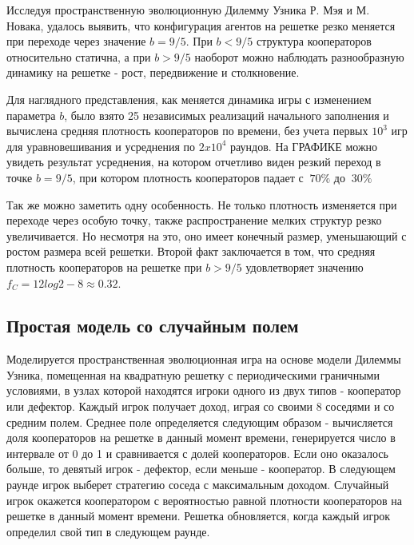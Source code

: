 \documentclass[12pt,a4paper]{article}
\begin{document}
	\par Исследуя пространственную эволюционную Дилемму Узника Р. Мэя и М. Новака, удалось выявить, что конфигурация агентов на решетке резко меняется при переходе через значение $b = 9/5$. При $b<9/5$ структура кооператоров относительно статична, а при $b>9/5$ наоборот можно наблюдать разнообразную динамику на решетке - рост, передвижение и столкновение.
	
	\par Для наглядного представления, как меняется динамика игры с изменением параметра $b$, было взято 25 независимых реализаций начального заполнения и вычислена средняя плотность кооператоров по времени, без учета первых $10^{3}$ игр для уравновешивания и усреднения по $2 x 10^{4}$ раундов. На ГРАФИКЕ можно увидеть результат усреднения, на котором отчетливо виден резкий переход в точке $b=9/5$, при котором плотность кооператоров падает с $~70\% $ до $~30\%$
	
	\par Так же можно заметить одну особенность. Не только плотность изменяется при  переходе через особую точку, также распространение мелких структур резко увеличивается. Но несмотря на это, оно имеет конечный размер, уменьшающий с ростом размера всей решетки. Второй факт заключается в том, что средняя плотность кооператоров на решетке при $b>9/5$ удовлетворяет значению $ f_{C} = 12log2-8 \approx 0.32$.
	
	\subsection{Простая модель со случайным полем}
	
	\par Моделируется пространственная эволюционная игра на основе модели
	Дилеммы Узника, помещенная на квадратную решетку с периодическими граничными
	условиями, в узлах которой находятся игроки одного из двух типов - кооператор 
	или дефектор. Каждый игрок получает доход, играя со своими 8 соседями и со средним полем. Среднее поле определяется следующим образом - вычисляется доля кооператоров на решетке в данный момент времени, генерируется число в интервале от 0 до 1 и сравнивается с долей кооператоров. Если оно оказалось больше, то девятый игрок - дефектор, если меньше - кооператор. В следующем раунде игрок выберет стратегию соседа с максимальным доходом. Случайный игрок окажется кооператором с вероятностью
	равной плотности кооператоров на решетке в данный момент времени. Решетка 
	обновляется, когда каждый игрок определил свой тип в следующем раунде.
	
\end{document}
